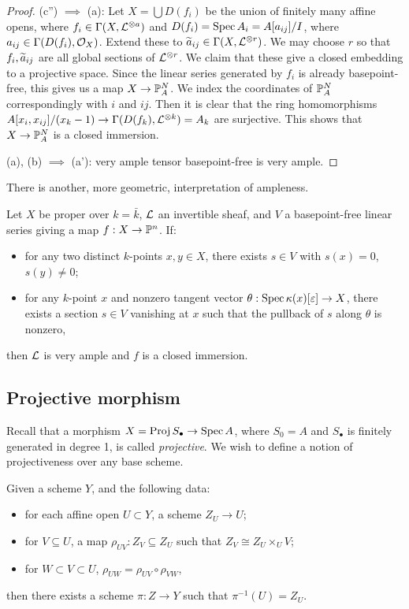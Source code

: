\documentclass[11pt]{amsart}
\begin{document}
\begin{proof}
    (c'') $\implies$ (a): Let $X = \bigcup D(f_i)$ be the union of finitely many affine opens, where $f_i\in \Gamma(X, \mathcal{L}^{\otimes a})$ and $D(f_i) = \operatorname{Spec} A_i = A[a_{ij}]/I$, where $a_{ij}\in \Gamma(D(f_i),\mathcal{O}_X)$. Extend these to $\widetilde{a}_{ij} \in \Gamma(X, \mathcal{L}^{\otimes r})$. We may choose $r$ so that $f_i, \widetilde{a}_{ij}$ are all global sections of $\mathcal{L}^{\otimes r}$. We claim that these give a closed embedding to a projective space. Since the linear series generated by $f_i$ is already basepoint-free, this gives us a map $X\to \mathbb{P}^N_A$. We index the coordinates of $\mathbb{P}^N_A$ correspondingly with $i$ and $ij$. Then it is clear that the ring homomorphisms $A[x_i,x_{ij}]/(x_k-1) \to \Gamma(D(f_k),\mathcal{L}^{\otimes k}) = A_k$ are surjective. This shows that $X\to \mathbb{P}^N_A$ is a closed immersion.

    (a), (b) $\implies$ (a'): very ample tensor basepoint-free is very ample.
\end{proof}


There is another, more geometric, interpretation of ampleness.

\begin{prop}

Let $X$ be proper over $k = \bar{k}$, $\mathcal{L}$ an invertible sheaf, and $V$ a basepoint-free linear series giving a map $f: X\to \mathbb{P}^n$. If:
\begin{itemize}
    \item for any two distinct $k$-points $x,y \in X$, there exists $s\in V$ with $s(x) = 0$, $s(y)\neq 0$;
    \item for any $k$-point $x$ and nonzero tangent vector $\theta: \operatorname{Spec} \kappa(x)[\varepsilon] \to X$, there exists a section $s\in V$ vanishing at $x$ such that the pullback of $s$ along $\theta$ is nonzero,
\end{itemize}
then $\mathcal{L}$ is very ample and $f$ is a closed immersion.
\end{prop}



\subsection{Projective morphism}

Recall that a morphism $X = \operatorname{Proj} S_\bullet \to \operatorname{Spec} A$, where $S_0 = A$ and $S_\bullet$ is finitely generated in degree 1, is called \emph{projective}. We wish to define a notion of projectiveness over any base scheme.


\begin{lem}
    Given a scheme $Y$, and the following data:
    \begin{itemize}
        \item for each affine open $U\subset Y$, a scheme $Z_U\to U$;
        \item for $V\subseteq U$, a map $\rho_{UV}: Z_V\subseteq Z_U$ such that $Z_V \cong Z_U\times_U V$;
        \item for $W\subset V\subset U$, $\rho_{UW} = \rho_{UV}\circ \rho_{VW}$,
    \end{itemize}
    then there exists a scheme $\pi: Z\to Y$ such that $\pi^{-1}(U) = Z_U$.
\end{lem}
\end{document}
